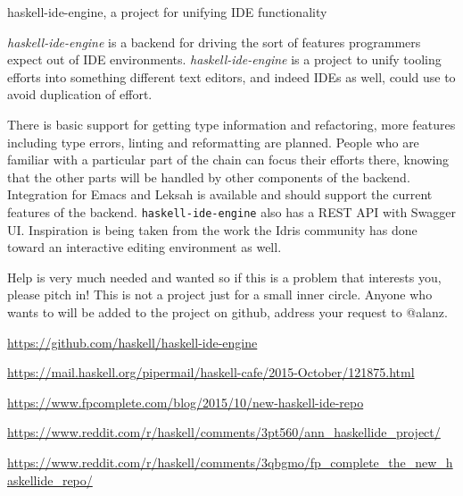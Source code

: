 \begin{hcarentry}{haskell-ide-engine, a project for unifying IDE functionality}
\label{haskell-ide-engine}

\makeheader

\textit{haskell-ide-engine} is a backend for driving the sort of features programmers
expect out of IDE environments. \textit{haskell-ide-engine} is a project to unify tooling
efforts into something different text editors, and indeed IDEs as well, could
use to avoid duplication of effort.


There is basic support for getting type information and refactoring,
more features including type errors, linting and reformatting are
planned. People who are familiar with a particular part of the chain
can focus their efforts there, knowing that the other parts will be
handled by other components of the backend. Integration for Emacs and
Leksah is available and should support the current features of the
backend. \texttt{haskell-ide-engine} also has a REST API with Swagger UI.
Inspiration is being taken from the work the Idris community has done
toward an interactive editing environment as well.

Help is very much needed and wanted so if this is a problem that interests you,
please pitch in! This is not a project just for a small inner circle. Anyone
who wants to will be added to the project on github, address your request to
@alanz.

\FurtherReading
\begin{compactitem}
\item\url{https://github.com/haskell/haskell-ide-engine}
\item\url{https://mail.haskell.org/pipermail/haskell-cafe/2015-October/121875.html}
\item\url{https://www.fpcomplete.com/blog/2015/10/new-haskell-ide-repo}
\item\url{https://www.reddit.com/r/haskell/comments/3pt560/ann_haskellide_project/}
\item\url{https://www.reddit.com/r/haskell/comments/3qbgmo/fp_complete_the_new_haskellide_repo/}
\end{compactitem}

\end{hcarentry}
